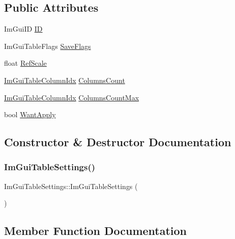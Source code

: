 \subsection*{Public Attributes}
\begin{DoxyCompactItemize}
\item 
Im\+Gui\+ID \hyperlink{structImGuiTableSettings_affa6cd90f4357ed81f37396094911d96}{ID}
\item 
Im\+Gui\+Table\+Flags \hyperlink{structImGuiTableSettings_a9c936817432e02d76d8f9391aed70d85}{Save\+Flags}
\item 
float \hyperlink{structImGuiTableSettings_a398a341e350a8aaf3758e0d4b773f39b}{Ref\+Scale}
\item 
\hyperlink{imgui__internal_8h_abe1882c8292cd23a77a54eda2407f147}{Im\+Gui\+Table\+Column\+Idx} \hyperlink{structImGuiTableSettings_ae7802faa283782844c7d6f822e51fd98}{Columns\+Count}
\item 
\hyperlink{imgui__internal_8h_abe1882c8292cd23a77a54eda2407f147}{Im\+Gui\+Table\+Column\+Idx} \hyperlink{structImGuiTableSettings_ac8dab6d2b13a5a77217d24ea237eecc1}{Columns\+Count\+Max}
\item 
bool \hyperlink{structImGuiTableSettings_a2b19bf1e2dacda4ee39d3a5c216a53c7}{Want\+Apply}
\end{DoxyCompactItemize}


\subsection{Constructor \& Destructor Documentation}
\mbox{\label{structImGuiTableSettings_ae40bd13d3f4d1bde0d46fe12a0628777}} 
\subsubsection{\texorpdfstring{Im\+Gui\+Table\+Settings()}{ImGuiTableSettings()}}
{\footnotesize\ttfamily Im\+Gui\+Table\+Settings\+::\+Im\+Gui\+Table\+Settings (\begin{DoxyParamCaption}{ }\end{DoxyParamCaption})\hspace{0.3cm}{\ttfamily [inline]}}



\subsection{Member Function Documentation}
\mbox{\label{structImGuiTableSettings_ad5bc9a71db18b61d9940c14aec13762d}} 
